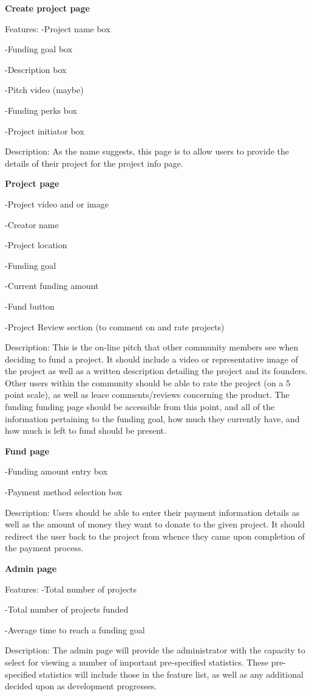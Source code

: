 \documentclass[12pt]{article}
\begin{document}
\begin{enumerate}
\textbf{Create project page}

Features:
-Project name box

-Funding goal box

-Description box

-Pitch video (maybe)

-Funding perks box

-Project initiator  box

Description:
As the name suggests, this page is to allow users to provide the details of their project for the project info page.

\textbf{Project page}

-Project video and or image

-Creator name

-Project location

-Funding goal

-Current funding amount

-Fund button

-Project Review section (to comment on and rate projects)

Description:
This is the on-line pitch that other community members see when deciding to fund a project.
It should include a video or representative image of the project as well as a written description detailing the 
project and its founders.
Other users within the community should be able to rate the project (on a 5 point scale), as well as leace comments/reviews
concerning the product. The funding funding page should be accessible from this point, and all of the information pertaining
to the funding goal, how much they currently have, and how much is left to fund should be present.

\textbf{Fund page}

-Funding amount entry box

-Payment method selection box

Description:
Users should be able to enter their payment information details as well as the amount of money they want to donate to
the given project.
It should redirect the user back to the project from whence they came upon completion of the payment process.

\textbf{Admin page}

Features:
-Total number of projects

-Total number of projects funded

-Average time to reach a funding goal

Description:
The admin page will provide the administrator with the capacity to select for viewing a number of important pre-specified statistics.
These pre-specified statistics will include those in the feature list, as well as any additional decided upon as development progresses.



\end{enumerate}
\end{document}
